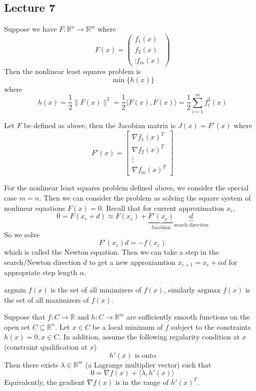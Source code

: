 \subsection{Lecture 7}
\begin{definition}
  Suppose we have $F: \mathbb R^n \to \mathbb R^m$ where $$F(x) = \begin{pmatrix}
    f_1(x) \\ f_2(x) \\ \vdots f_m(x)
  \end{pmatrix}$$ Then the nonlinear least squares problem is $$\min \{h(x)\}$$ where $$h(x) = \frac{1}{2} \|F(x)\|^2 = \frac{1}{2}\langle F(x), F(x) \rangle = \frac{1}{2} \sum^m_{i=1} f_i^2(x)$$
\end{definition}
\begin{definition}
  Let $F$ be defined as above, then the Jacobian matrix is $J(x) = F'(x)$ where $$F'(x) = \begin{bmatrix}
    \nabla f_1(x)^T \\ \nabla f_2(x)^T \\ \vdots \\ \nabla f_m(x)^T
  \end{bmatrix}$$
\end{definition}
\begin{problem}
  For the nonlinear least squares problem defined above, we consider the special case $m = n$. Then we can consider the problem as solving the square system of nonlinear equations $F(x) = 0$. Recall that for current approximation $x_c$, $$0 = F(x_c + d) \approx F(x_c) + \underbrace{F'(x_c)}_{\text{Jacobian}}\underbrace{d}_{\text{search direction}}$$ So we solve $$F'(x_c)d = -f(x_c)$$ which is called the Newton equation. Then we can take a step in the search/Newton direction $d$ to get a new approxiamtion $x_{c+1} = x_c + \alpha d$ for appropriate step length $\alpha$.
\end{problem}
\begin{definition}
  $\text{argmin } f(x)$ is the set of all minimizers of $f(x)$, similarly $\text{argmax }f(x)$ is the set of all maximizers of $f(x)$.
\end{definition}
\begin{theorem}
  Suppose that $f: C \to \mathbb R$ and $h: C \to \mathbb R^m$ are sufficiently smooth functions on the open set $C \subseteq \mathbb R^n$. Let $x \in C$ be a local minimum of $f$ subject to the constraints $h(x) = 0, x \in C$. In addition, assume the following regularity condition at $x$ (constraint qualification at $x$) $$h'(x) \text{ is onto}$$
  Then there exists $\lambda \in \mathbb R^m$ (a Lagrange multiplier vector) such that $$0 = \nabla f(x) + \langle \lambda, h'(x) \rangle$$ Equivalently, the gradient $\nabla f(x)$ is in the range of $h'(x)^T$.
\end{theorem}